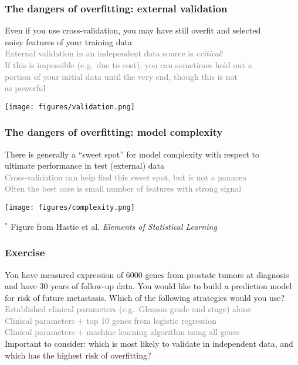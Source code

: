 \documentclass{beamer}
\newcommand{\si}[1]{\hspace{.5cm} \textcolor{gray} {#1}\\}
\newcommand{\sicont}[1]{\hspace{1cm} \textcolor{gray} {#1}\\}
\begin{document}
{\begin{frame}[t]
\frametitle{The dangers of overfitting: external validation}
Even if you use cross-validation, you may have still overfit and selected\\
\hspace{.5cm} noisy features of your training data\\
\si{External validation in an independent data source is \emph{critical}!}
\si{If this is impossible (e.g.\ due to cost), you can sometimes hold out a}
\sicont{portion of your initial data until the very end, though this is not}
\sicont{as powerful}
\begin{center}
\texttt{[image: figures/validation.png]}
\end{center}
\end{frame}

\begin{frame}[t]
\frametitle{The dangers of overfitting: model complexity}
There is generally a ``sweet spot'' for model complexity with respect to\\
\hspace{.5cm} ultimate performance in test (external) data\\
\si{Cross-validation can help find this sweet spot, but is not a panacea}
\si{Often the best case is small number of features with strong signal}
\begin{center}
\texttt{[image: figures/complexity.png]}
\end{center}
\begin{flushright}
\tiny{$^*$ Figure from Hastie et al. \emph{Elements of Statistical Learning}}
\end{flushright}
\end{frame}


\begin{frame}[t]
\frametitle{Exercise}
You have measured expression of 6000 genes from prostate tumors at diagnosis and have 30 years of follow-up data. You would like to build a prediction model for risk of future metastasis. Which of the following strategies would you use?\\
\si{Established clinical parameters (e.g.\ Gleason grade and stage) alone}
\si{Clinical parameters + top 10 genes from logistic regression}
\si{Clinical parameters + machine learning algorithm using all genes}
\vspace{.2cm}
Important to consider: which is most likely to validate in independent data, and which has the highest risk of overfitting?
\end{frame}

}
\end{document}
